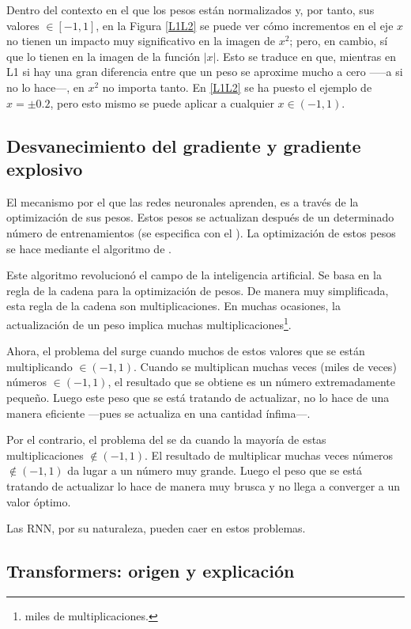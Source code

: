Dentro del contexto en el que los pesos están normalizados y, por tanto, sus valores $\in [-1, 1]$, en la Figura \ref{L1L2} se puede ver cómo incrementos en el eje $x$ no tienen un impacto muy significativo en la imagen  de $x^2$; pero, en cambio, sí que lo tienen en la imagen de la función $|x|$. Esto se traduce en que, mientras en L1 si hay una gran diferencia entre que un peso se aproxime mucho a cero -----a si no lo hace---, en $x^2$ no importa tanto. En \ref{L1L2} se ha puesto el ejemplo de $x = \pm 0.2$, pero esto mismo se puede aplicar a cualquier $x \in (-1,1)$.


\subsection{Desvanecimiento del gradiente y gradiente explosivo}
\label{ap:grad}
El mecanismo por el que las redes neuronales aprenden, es a través de la optimización de sus pesos. Estos pesos se actualizan después de un determinado número de entrenamientos (se especifica con el ). La optimización de estos pesos se hace mediante el algoritmo de  \parencite{bp}.

Este algoritmo revolucionó el campo de la inteligencia artificial. Se basa en la regla de la cadena para la optimización de pesos. De manera muy simplificada, esta regla de la cadena son multiplicaciones. En muchas ocasiones, la actualización de un peso implica muchas multiplicaciones\footnote{miles de multiplicaciones.}.


Ahora, el problema del  surge cuando muchos de estos valores que se están multiplicando  $\in (-1, 1)$. Cuando se multiplican muchas veces (miles de veces) números $\in (-1,1)$, el resultado que se obtiene es un número extremadamente pequeño. Luego este peso que se está tratando de actualizar, no lo hace de una manera eficiente ---pues se actualiza en una cantidad ínfima---.

Por el contrario, el problema del  se da cuando la mayoría de estas multiplicaciones $\notin (-1,1)$. El resultado de multiplicar muchas veces números $\notin (-1,1)$ da lugar a un número muy grande. Luego el peso que se está tratando de actualizar lo hace de manera muy brusca y no llega a converger a un valor óptimo.

Las RNN, por su naturaleza, pueden caer en estos problemas.

\subsection{Transformers: origen y explicación}
\label{ap:trans}

